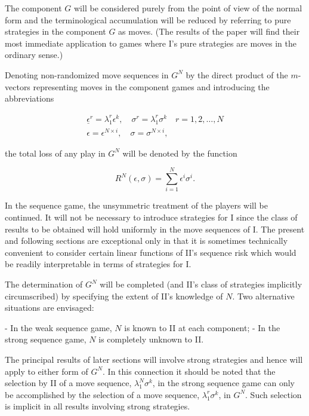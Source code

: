 \documentclass[11pt]{article}
\numberwithin{equation}{section}
\theoremstyle{boldStyle}
\begin{document}
The component \( G \) will be considered purely from the point of view of the normal form and the terminological accumulation 
will be reduced by referring to pure strategies in the component \( G \) as moves. (The results of the paper will find their most 
immediate application to games where I's pure strategies are moves in the ordinary sense.)

Denoting non-randomized move sequences in \( G^N \) by the direct product of the \( m \)-vectors representing moves in the component 
games and introducing the abbreviations

\begin{equation}
    \begin{aligned}
        \underline{\epsilon}^r  = \lambda_1^r \epsilon^k, \quad \sigma^r = \lambda_1^r \sigma^k \quad r = 1, 2, \ldots, N \\
        \epsilon = \epsilon^{N \times i}, \quad \sigma = \sigma^{N \times i},
    \end{aligned}
\end{equation}

the total loss of any play in \( G^N \) will be denoted by the function

\[
R^N(\epsilon, \sigma) = \sum_{i=1}^{N} \epsilon^i \sigma^i.
\]

In the sequence game, the unsymmetric treatment of the players will be continued. It will not be necessary to introduce strategies for I since the class of results to be obtained will hold uniformly in the move sequences of I. The present and following sections are exceptional only in that it is sometimes technically convenient to consider certain linear functions of II's sequence risk which would be readily interpretable in terms of strategies for I.

The determination of \( G^N \) will be completed (and II's class of strategies implicitly circumscribed) by specifying the extent of II's knowledge of \( N \). Two alternative situations are envisaged:

- In the weak sequence game, \( N \) is known to II at each component;
- In the strong sequence game, \( N \) is completely unknown to II.

The principal results of later sections will involve strong strategies and hence will apply to either form of \( G^N \). In this connection it should be noted that the selection by II of a move sequence, \( \lambda_1^N \sigma^k \), in the strong sequence game can only be accomplished by the selection of a move sequence, \( \lambda_1^r \sigma^k \), in \( G^N \). Such selection is implicit in all results involving strong strategies.
\end{document}
